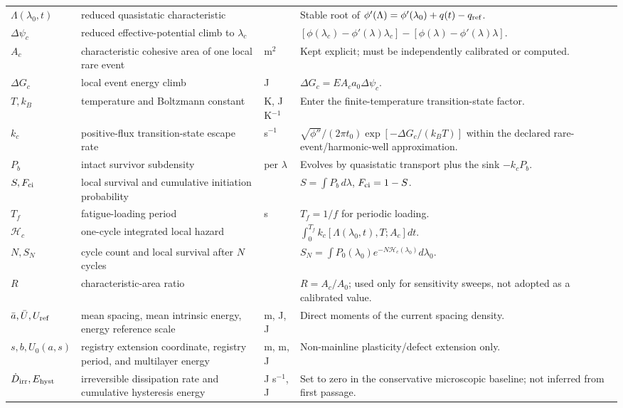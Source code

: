\begin{longtable}{>{\raggedright\arraybackslash}p{}>{\raggedright\arraybackslash}p{}>{\raggedright\arraybackslash}p{}>{\raggedright\arraybackslash}p{}}
$\Lambda(\lambda_0,t)$ & reduced quasistatic characteristic & 1 & Stable root of $\phi'(\Lambda)=\phi'(\lambda_0)+q(t)-q_{\rm ref}$. \\
$\Delta\psi_c$ & reduced effective-potential climb to $\lambda_c$ & 1 & $[\phi(\lambda_c)-\phi'(\lambda)\lambda_c]-[\phi(\lambda)-\phi'(\lambda)\lambda]$. \\
$A_c$ & characteristic cohesive area of one local rare event & m$^2$ & Kept explicit; must be independently calibrated or computed. \\
$\Delta G_c$ & local event energy climb & J & $\Delta G_c=EA_ca_0\Delta\psi_c$. \\
$T,k_B$ & temperature and Boltzmann constant & K, J K$^{-1}$ & Enter the finite-temperature transition-state factor. \\
$k_c$ & positive-flux transition-state escape rate & s$^{-1}$ & $\sqrt{\phi''}/(2\pi t_0)\exp[-\Delta G_c/(k_BT)]$ within the declared rare-event/harmonic-well approximation. \\
$P_b$ & intact survivor subdensity & 1 per $\lambda$ & Evolves by quasistatic transport plus the sink $-k_cP_b$. \\
$S,F_{\rm ci}$ & local survival and cumulative initiation probability & 1 & $S=\int P_b\,d\lambda$, $F_{\rm ci}=1-S$. \\
$T_f$ & fatigue-loading period & s & $T_f=1/f$ for periodic loading. \\
$\mathcal H_c$ & one-cycle integrated local hazard & 1 & $\int_0^{T_f}k_c[\Lambda(\lambda_0,t),T;A_c]dt$. \\
$N,S_N$ & cycle count and local survival after $N$ cycles & 1 & $S_N=\int P_0(\lambda_0)e^{-N\mathcal H_c(\lambda_0)}d\lambda_0$. \\
$R$ & characteristic-area ratio & 1 & $R=A_c/A_0$; used only for sensitivity sweeps, not adopted as a calibrated value. \\
$\bar a,\bar U,U_{\rm ref}$ & mean spacing, mean intrinsic energy, energy reference scale & m, J, J & Direct moments of the current spacing density. \\
$s,b,U_0(a,s)$ & registry extension coordinate, registry period, and multilayer energy & m, m, J & Non-mainline plasticity/defect extension only. \\
$\dot D_{\rm irr},E_{\rm hyst}$ & irreversible dissipation rate and cumulative hysteresis energy & J s$^{-1}$, J & Set to zero in the conservative microscopic baseline; not inferred from first passage. \\
\end{longtable}
\normalsize

